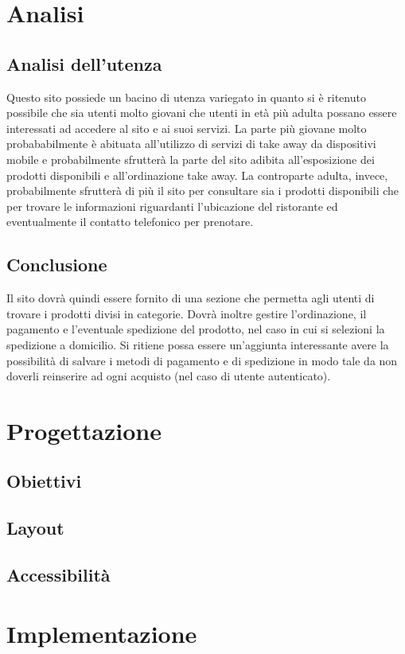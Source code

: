\documentclass{article}
\begin{document}
	\section{Analisi}
		\subsection{Analisi dell'utenza}
			Questo sito possiede un bacino di utenza variegato in quanto si è ritenuto possibile che sia utenti molto giovani che utenti in età più adulta possano essere interessati ad accedere al sito e ai suoi servizi.
			La parte più giovane molto probababilmente è abituata all'utilizzo di servizi di take away da dispositivi mobile e probabilmente sfrutterà la parte del sito adibita all'esposizione dei prodotti disponibili e all'ordinazione take away.
			La controparte adulta, invece, probabilmente sfrutterà di più il sito per consultare sia i prodotti disponibili che per trovare le informazioni riguardanti l'ubicazione del ristorante ed eventualmente il contatto telefonico per prenotare. 
		\subsection{Conclusione}
			Il sito dovrà quindi essere fornito di una sezione che permetta agli utenti di trovare i prodotti divisi in categorie. Dovrà inoltre gestire l'ordinazione, il pagamento e l'eventuale spedizione del prodotto, nel caso in cui si selezioni la spedizione a domicilio.
			Si ritiene possa essere un'aggiunta interessante avere la possibilità di salvare i metodi di pagamento e di spedizione in modo tale da non doverli reinserire ad ogni acquisto (nel caso di utente autenticato).	
	\section{Progettazione}
		\subsection{Obiettivi}
		\subsection{Layout}
		\subsection{Accessibilità}
	\section{Implementazione}
\end{document}
